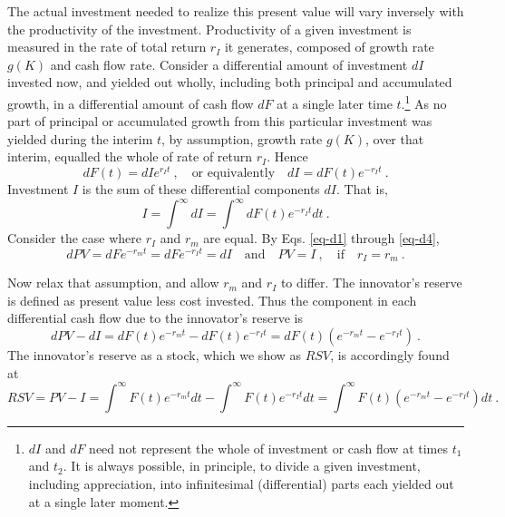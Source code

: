 \documentclass[a4padisinvitingper,fleqn]{latex_styles/cas-sc}
\begin{document}
The actual investment needed to realize this present value will vary inversely with the productivity of the investment. Productivity of a given investment is measured in the rate of total return \(r_I\) it generates, composed of growth rate \(g(K)\) and cash flow rate. Consider a differential amount of investment \(d I\) invested now, and yielded out wholly, including both principal and accumulated growth, in a differential amount of cash flow \(d F\) at a single later time \(t\).\footnote{\(d I\) and \(d F\) need not represent the whole of investment or cash flow at times \(t_1\) and \(t_2\). It is always possible, in principle, to divide a given investment, including appreciation, into infinitesimal (differential) parts each yielded out at a single later moment.} As no part of principal or accumulated growth from this particular investment was yielded during the interim \(t\), by assumption, growth rate \(g(K)\), over that interim, equalled the whole of rate of return \(r_I\). Hence
%
\begin{equation}
    d F(t) = d I e^{r_{I} t}\ , \quad \text{or equivalently} \quad d I = d F(t) e^{-r_{I} t} \ .\label{eq-d3}
\end{equation}
%
Investment \(I\) is the sum of these differential components \(d I\). That is,
%
\begin{equation}
I = \int^{\infty} d I = \int^{\infty} d F(t) e^{-r_{I}t} d t \ .\label{eq-d4}
\end{equation}
%
Consider the case where \(r_I\) and \(r_m\) are equal. By Eqs. \eqref{eq-d1} through \eqref{eq-d4},
\begin{equation}
    dPV = d Fe^{-r_{m} t} = d F e^{-r_{I} t} = d I \quad \text{and} \quad PV = I\ , \quad  \text{if}\quad r_I = r_m \ .\label{eq-d5}
\end{equation}

Now relax that assumption, and allow \(r_m\) and \(r_I\) to differ. The innovator's reserve is defined as present value less cost invested. Thus the component in each differential cash flow due to the innovator's reserve is
\begin{equation*}
    d PV - dI = d F(t) e^{-r_m t} - dF(t)e^{-r_I t} = d F(t) (e^{-r_m t} - e^{-r_I t}) \ .
\end{equation*}
%
The innovator's reserve as a stock, which we show as \(RSV\), is accordingly found at
\begin{equation}
    RSV = PV - I = \int^{\infty} F(t) e^{-r_m t} d t - \int^{\infty} F(t) e^{-r_I t} d t = \int^{\infty} F(t) (e^{-r_m t} - e^{-r_I t}) d t \ .\label{eq-d6}
\end{equation}
\end{document}
